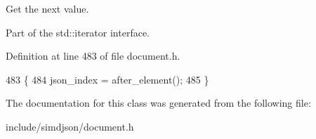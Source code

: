 Get the next value. 

Part of the std\+::iterator interface. 

Definition at line 483 of file document.\+h.


\begin{DoxyCode}
483                                                        \{
484   json\_index = after\_element();
485 \}
\end{DoxyCode}


The documentation for this class was generated from the following file\+:\begin{DoxyCompactItemize}
\item 
include/simdjson/document.\+h\end{DoxyCompactItemize}
